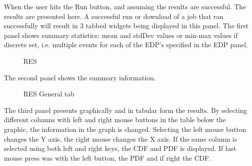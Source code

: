 When the user hits the Run button, and assuming the results are
successful. The results are presented here.  A successful run or
download of a job that ran successfully will result in 3 tabbed
widgets being displayed in this panel.  The first panel shows summary
statistics: mean and stdDev values or min-max values if discrete set,
i.e. multiple events for each of the EDP's specified in the EDP panel.

\begin{figure}[!htbp]
  \caption{RES}
  \label{fig:figure12}
\end{figure}

The second panel shows the summary information.

\begin{figure}[!htbp]
  \caption{RES General tab}
  \label{fig:figure13}
\end{figure}

The third panel presents graphically and in tabular form the
results. By selecting different columns with left and right mouse
buttons in the table below the graphic, the information in the graph
is changed. Selecting the left mouse button changes the Y axis, the
right mouse changes the X axis. If the same column is selected using
both left and right keys, the CDF and PDF is displayed. If last mouse
press was with the left button, the PDF and if right the CDF.
 
